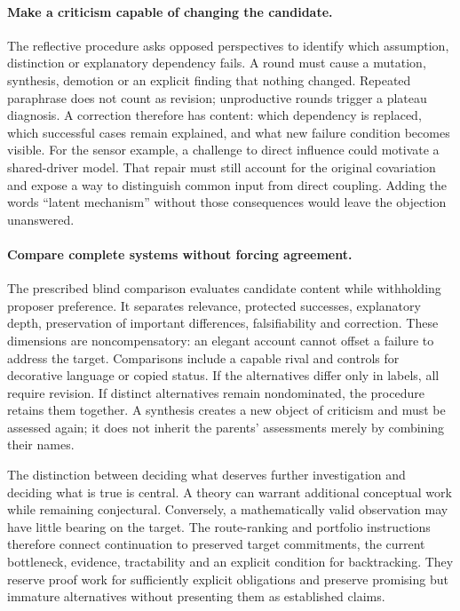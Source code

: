 \paragraph{Make a criticism capable of changing the candidate.}
The reflective procedure asks opposed perspectives to identify which assumption, distinction or explanatory dependency fails. A round must cause a mutation, synthesis, demotion or an explicit finding that nothing changed. Repeated paraphrase does not count as revision; unproductive rounds trigger a plateau diagnosis. A correction therefore has content: which dependency is replaced, which successful cases remain explained, and what new failure condition becomes visible. For the sensor example, a challenge to direct influence could motivate a shared-driver model. That repair must still account for the original covariation and expose a way to distinguish common input from direct coupling. Adding the words ``latent mechanism'' without those consequences would leave the objection unanswered.

\paragraph{Compare complete systems without forcing agreement.}
The prescribed blind comparison evaluates candidate content while withholding proposer preference. It separates relevance, protected successes, explanatory depth, preservation of important differences, falsifiability and correction. These dimensions are noncompensatory: an elegant account cannot offset a failure to address the target. Comparisons include a capable rival and controls for decorative language or copied status. If the alternatives differ only in labels, all require revision. If distinct alternatives remain nondominated, the procedure retains them together. A synthesis creates a new object of criticism and must be assessed again; it does not inherit the parents' assessments merely by combining their names.

The distinction between deciding what deserves further investigation and deciding what is true is central. A theory can warrant additional conceptual work while remaining conjectural. Conversely, a mathematically valid observation may have little bearing on the target. The route-ranking and portfolio instructions therefore connect continuation to preserved target commitments, the current bottleneck, evidence, tractability and an explicit condition for backtracking. They reserve proof work for sufficiently explicit obligations and preserve promising but immature alternatives without presenting them as established claims.

